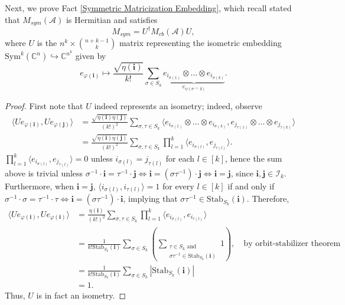 \documentclass[11pt]{article}
\begin{document}
Next, we prove Fact \ref{Symmetric Matricization Embedding}, which recall stated that $M_{sym}(\mathcal{A})$ is Hermitian and satisfies
\[M_{sym} = U^{\dagger}M_{cb}(\mathcal{A})U,\]
where $U$ is the $n^k\times \binom{n+k-1}{k}$ matrix representing the isometric embedding $\mathrm{Sym}^k(\mathbb{C}^n)\hookrightarrow \mathbb{C}^{n^k}$ given by 
\[e_{\varphi(\mathbf{i})}\mapsto \frac{\sqrt{\eta(\mathbf{i})}}{k!}\sum\limits_{\sigma\in S_k}\underbrace{e_{i_{\sigma(1)}}\otimes\dots\otimes e_{i_{\sigma(k)}}}_{e_{\psi(\sigma^{-1}\cdot \mathbf{i})}}.\]
\begin{proof}
    First note that $U$ indeed represents an isometry; indeed, observe
    \begin{align*}
        \langle Ue_{\varphi(\mathbf{i})},Ue_{\varphi(\mathbf{j})}\rangle &= \frac{\sqrt{\eta(\mathbf{i})\eta(\mathbf{j})}}{(k!)^2}\sum\limits_{\sigma,\tau\in S_k}\langle e_{i_{\sigma(1)}}\otimes\dots\otimes e_{i_{\sigma(k)}},e_{j_{\tau(1)}}\otimes\dots\otimes e_{j_{\tau(k)}}\rangle  \\
        &= \frac{\sqrt{\eta(\mathbf{i})\eta(\mathbf{j})}}{(k!)^2}\sum\limits_{\sigma,\tau\in S_k}\prod\limits_{l=1}^k\langle e_{i_{\sigma(l)}},e_{j_{\tau(l)}}\rangle.
    \end{align*}
    $\prod\limits_{l=1}^k\langle e_{i_{\sigma(l)}},e_{j_{\tau(l)}}\rangle = 0$ unless $i_{\sigma(l)} = j_{\tau(l)}$ for each $l\in [k]$, hence the sum above is trivial unless $\sigma^{-1}\cdot \mathbf{i} = \tau^{-1}\cdot \mathbf{j} \iff \mathbf{i} = (\sigma\tau^{-1})\cdot \mathbf{j} \iff \mathbf{i} = \mathbf{j}$, since $\mathbf{i},\mathbf{j}\in \mathcal{I}_k$. Furthermore, when $\mathbf{i}=\mathbf{j}$, $\langle i_{\sigma(l)},i_{\tau(l)}\rangle=1$ for every $l\in [k]$ if and only if $\sigma^{-1}\cdot \sigma = \tau^{-1}\cdot \tau \iff \mathbf{i} = (\sigma\tau^{-1})\cdot \mathbf{i}$, implying that $\sigma\tau^{-1}\in \mathrm{Stab}_{S_k}(\mathbf{i})$. Therefore, 
    \begin{align*}
        \langle Ue_{\varphi(\mathbf{i})},Ue_{\varphi(\mathbf{i})}\rangle &= \frac{\eta(\mathbf{i})}{(k!)^2}\sum\limits_{\sigma,\tau\in S_k}\prod\limits_{l=1}^k\langle e_{i_{\sigma(l)}},e_{i_{\tau(l)}}\rangle \\
        &= \frac{1}{k!\mathrm{Stab}_{S_k}(\mathbf{i})}\sum\limits_{\sigma\in S_k}\left(\sum\limits_{\substack{\tau\in S_k\text{ and } \\ \sigma\tau^{-1}\in \mathrm{Stab}_{S_k}(\mathbf{i})}}1\right),\quad \text{by orbit-stabilizer theorem} \\
        &= \frac{1}{k!\mathrm{Stab}_{S_k}(\mathbf{i})}\sum\limits_{\sigma\in S_k}|\mathrm{Stab}_{S_k}(\mathbf{i})| \\
        &= 1.
    \end{align*}
    Thus, $U$ is in fact an isometry. 


\end{proof}
\end{document}
